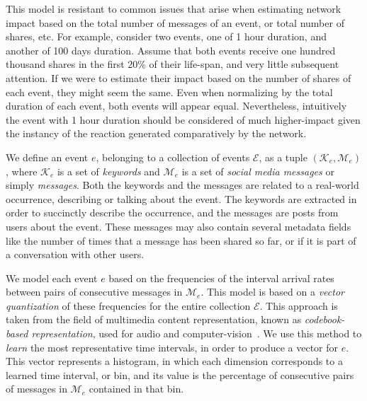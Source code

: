 \documentclass[10pt,letterpaper]{article}
\begin{document}
This model is resistant to common issues that arise when estimating
network impact based on the total number of messages of an event, or
total number of shares, etc. For example, consider two events, one of
1 hour duration, and another of 100 days duration. Assume that both
events receive one hundred thousand shares in the first 20\% of their
life-span, and very little subsequent attention. If we were to
estimate their impact based on the number of shares of each event,
they might seem the same. Even when normalizing by the total duration
of each event, both events will appear equal. Nevertheless,
intuitively the event with 1 hour duration should be considered of
much higher-impact given the instancy of the reaction generated
comparatively by the network.

We define an event $e$, belonging to a collection of events
$\mathcal{E}$, as a tuple $(\mathcal{K}_e, \mathcal{M}_e)$, where
$\mathcal{K}_e$ is a set of \emph{keywords} and $\mathcal{M}_e$ is a
set of \emph{social media messages} or simply \emph{messages}. Both
the keywords and the messages are related to a real-world occurrence,
describing or talking about the event. The keywords are extracted in
order to succinctly describe the occurrence, and the messages are
posts from users about the event. These messages may also contain
several metadata fields like the number of times that a message has
been shared so far, or if it is part of a conversation with other
users.

We model each event $e$ based on the frequencies of the interval
arrival rates between pairs of consecutive messages in
$\mathcal{M}_e$. This model is based on a {\em vector quantization} of
these frequencies for the entire collection $\mathcal{E}$. This
approach is taken from the field of multimedia content representation,
known as {\em codebook-based representation}, used for audio and
computer-vision~\cite{ff,Vaizman}. We use this method to {\em learn}
the most representative time intervals, in order to produce a vector
for $e$. This vector represents a histogram, in which each dimension
corresponds to a learned time interval, or bin, and its value is the
percentage of consecutive pairs of messages in $\mathcal{M}_e$
contained in that bin.
\end{document}
